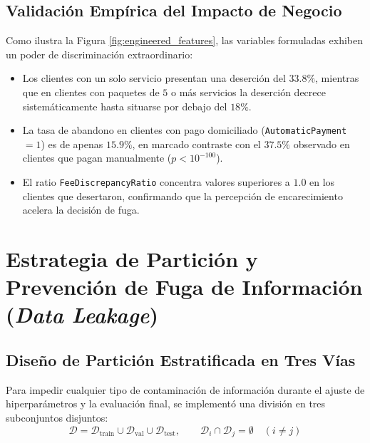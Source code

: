 \documentclass[11pt,letterpaper]{article}
\begin{document}
\subsection{Validación Empírica del Impacto de Negocio}
Como ilustra la Figura \ref{fig:engineered_features}, las variables formuladas exhiben un poder de discriminación extraordinario:
\begin{itemize}
    \item Los clientes con un solo servicio presentan una deserción del $33.8\%$, mientras que en clientes con paquetes de $5$ o más servicios la deserción decrece sistemáticamente hasta situarse por debajo del $18\%$.
    \item La tasa de abandono en clientes con pago domiciliado (\texttt{AutomaticPayment} $= 1$) es de apenas $15.9\%$, en marcado contraste con el $37.5\%$ observado en clientes que pagan manualmente ($p < 10^{-100}$).
    \item El ratio \texttt{FeeDiscrepancyRatio} concentra valores superiores a $1.0$ en los clientes que desertaron, confirmando que la percepción de encarecimiento acelera la decisión de fuga.
\end{itemize}

\section{Estrategia de Partición y Prevención de Fuga de Información (\textit{Data Leakage})}

\subsection{Diseño de Partición Estratificada en Tres Vías}
Para impedir cualquier tipo de contaminación de información durante el ajuste de hiperparámetros y la evaluación final, se implementó una división en tres subconjuntos disjuntos:
\begin{equation}
    \mathcal{D} = \mathcal{D}_{\text{train}} \cup \mathcal{D}_{\text{val}} \cup \mathcal{D}_{\text{test}}, \qquad \mathcal{D}_i \cap \mathcal{D}_j = \emptyset \quad (i \neq j)
\end{equation}
\end{document}
